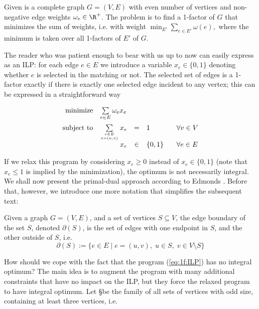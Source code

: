 \begin{framed}
  \begin{dfn}
    \label{dfn:minFactor}
    Given is a complete graph $G=(V,E)$ with even number of vertices and non-negative edge weights
    $\omega_e\in\R^+$. The problem \minfactor is to find a 1-factor of $G$ that minimizes the
    sum of weights, i.e. with weight $\min_{E'}\sum_{e\in E'}\omega(e),$ where the minimum is taken
    over all 1-factors of $E'$ of $G$.
  \end{dfn}\end{framed}


\noindent
The reader who was patient enough to bear with us up to now can easily express \minfactor as an ILP:
for each edge $e\in E$ we introduce a variable $x_e\in\{0,1\}$ denoting whether $e$ is selected in the matching
or not. The selected set of edges is a 1-factor exactly if there is exactly one selected edge incident to
any vertex; this can be expressed in a straightforward way

\begin{equation}
  \label{eq:1f:ILP}
\begin{array}{rrcll}
  {\rm minimize}     & \multicolumn{1}{l}{\sum\limits_{e\in E}\omega_ex_e}\\[3ex]
  {\rm subject\ to} &  \sum\limits_{e\in E\atop e=(u,v)} x_e &=&1& \;\;\;\forall v\in V\\
                          & x_e&\in&\{0,1\}& \;\;\;\forall e\in E\\
\end{array}
\end{equation}

\noindent
If we relax this program by considering $x_e\ge0$ instead of  $x_e\in\{0,1\}$ (note that  $x_e\le1$
is implied by the minimization), the optimum is not necessarily integral. We shall now present the
primal-dual approach according to Edmonds \cite{Edmonds65}. Before that, however, we introduce one more
notation that simplifies the subsequent text:


\begin{dfn}
  \label{dfn:edgeboundary}
Given a  graph  $G=(V,E)$, and a set of vertices $S\subseteq V$, the edge boundary of the set $S$,
denoted $\partial(S)$, is the set of edges with one endpoint in $S$, and the other outside of $S$, 
i.e.
$$\partial(S):=\{e\in E\mid e=(u,v),\;u\in S,\;v\in V\setminus S\}$$
\end{dfn}

\noindent
How should we cope with the fact that the program  (\ref{eq:1f:ILP}) has no integral optimum? The main
idea is to augment the program with many additional constraints that have no impact on the ILP, but they
force the relaxed program to have integral optimum. Let \S be the family of all sets of vertices 
with odd size, containing at least three vertices, i.e.

